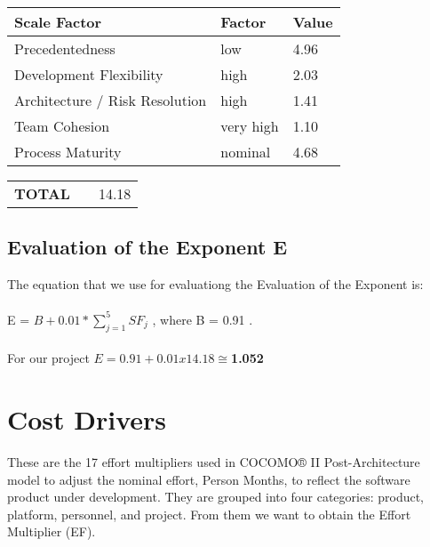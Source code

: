 \begin{center}
  \begin{tabular}{ l | l | l }%
   	\hline
	\textbf{Scale Factor} & \textbf{Factor} & \textbf{Value}
   	\\ \hline
    Precedentedness & low & 4.96
    \\\hline
    Development Flexibility & high & 2.03
    \\\hline
    Architecture / Risk Resolution & high & 1.41
    \\\hline
    Team Cohesion & very high & 1.10
 	\\\hline
 	Process Maturity & nominal & 4.68
   	\\\hline 
  \end{tabular}
  \begin{tabular}{ l l | l }%
   	\\\textbf{TOTAL} & & 14.18
  \end{tabular}
\end{center}

\subsection{Evaluation of the Exponent E}
The equation that we use for evaluationg the Evaluation of the Exponent is:
\\\\E = $B + 0.01 * \sum_{j=1}^{5} SF_j$ , where B = 0.91 .
\\\\For our project $E = 0.91 + 0.01 x 14.18 \cong $\textbf{1.052}

\newpage %
\section{Cost Drivers}
These are the 17 effort multipliers used in COCOMO® II Post-Architecture model to adjust the nominal effort, Person Months, to reflect the software product under development. They are grouped into four categories: product, platform, personnel, and project. From them we want to obtain the Effort Multiplier (EF).

